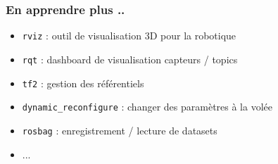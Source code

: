 \documentclass{beamer}
\begin{document}
\begin{frame}
\frametitle{En apprendre plus ..}
\begin{itemize}
    \item \texttt{rviz} : outil de visualisation 3D pour la robotique
    \item \texttt{rqt} : dashboard de visualisation capteurs / topics
    \item \texttt{tf2} : gestion des référentiels
    \item \texttt{dynamic\_reconfigure} : changer des paramètres à la volée
    \item \texttt{rosbag} : enregistrement / lecture de datasets
    \item ...
\end{itemize}
\end{frame}
    
\end{document}
